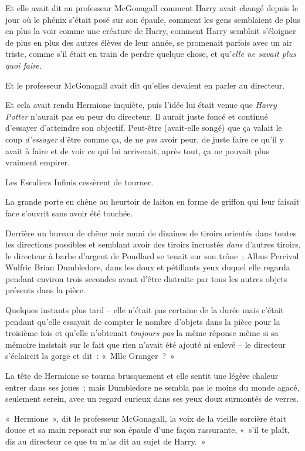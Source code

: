 Et elle avait dit au professeur McGonagall comment Harry avait changé depuis le jour où le phénix s'était posé sur son épaule, comment les gens semblaient de plus en plus la voir comme une créature de Harry, comment Harry semblait s'éloigner de plus en plus des autres élèves de leur année, se promenait parfois avec un air triste, comme s'il était en train de perdre quelque chose, et qu'\emph{elle ne savait plus quoi faire.}

Et le professeur McGonagall avait dit qu'elles devaient en parler au directeur.

Et cela avait rendu Hermione inquiète, puis l'idée lui était venue que \emph{Harry Potter} n'aurait pas eu peur du directeur.
Il aurait juste foncé et continué d'essayer d'atteindre son objectif.
Peut-être (avait-elle songé) que ça valait le coup \emph{d'essayer} d'être comme ça, de ne \emph{pas} avoir peur, de juste faire ce qu'il y avait à faire et de voir ce qui lui arriverait, après tout, ça ne pouvait plus vraiment empirer.

Les Escaliers Infinis cessèrent de tourner.

La grande porte en chêne au heurtoir de laiton en forme de griffon qui leur faisait face s'ouvrit sans avoir été touchée.

Derrière un bureau de chêne noir muni de dizaines de tiroirs orientés dans toutes les directions possibles et semblant avoir des tiroirs incrustés \emph{dans} d'autres tiroirs, le directeur à barbe d'argent de Poudlard se tenait sur son trône~; Albus Percival Wulfric Brian Dumbledore, dans les doux et pétillants yeux duquel elle regarda pendant environ trois secondes avant d'être distraite par tous les autres objets présents dans la pièce.

Quelques instants plus tard -- elle n'était pas certaine de la durée mais c'était pendant qu'elle essayait de compter le nombre d'objets dans la pièce pour la troisième fois et qu'elle n'obtenait \emph{toujours pas} la même réponse même si sa mémoire insistait sur le fait que rien n'avait été ajouté ni enlevé -- le directeur s'éclaircit la gorge et dit~: «~Mlle Granger~?~»

La tête de Hermione se tourna brusquement et elle sentit une légère chaleur entrer dans ses joues~; mais Dumbledore ne sembla pas le moins du monde agacé, seulement serein, avec un regard curieux dans ses yeux doux surmontés de verres.

«~Hermione~», dit le professeur McGonagall, la voix de la vieille sorcière était douce et sa main reposait sur son épaule d'une façon rassurante, «~s'il te plaît, dis au directeur ce que tu m'as dit au sujet de Harry.~»


